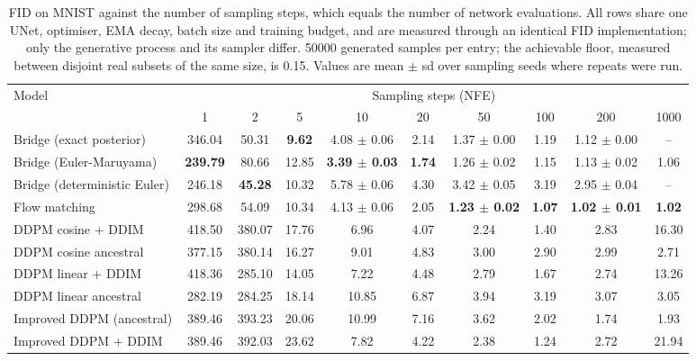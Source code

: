 \begin{table}[t]
\caption{FID on MNIST against the number of sampling steps, which equals the number of network evaluations. All rows share one UNet, optimiser, EMA decay, batch size and training budget, and are measured through an identical FID implementation; only the generative process and its sampler differ. 50000 generated samples per entry; the achievable floor, measured between disjoint real subsets of the same size, is 0.15. Values are mean $\pm$ sd over sampling seeds where repeats were run.}
\label{tab:fid-mnist}
\centering
\small
\begin{tabular}{lccccccccc}
\toprule
Model & \multicolumn{9}{c}{Sampling steps (NFE)} \\
\cmidrule(lr){2-10}
 & 1 & 2 & 5 & 10 & 20 & 50 & 100 & 200 & 1000 \\
\midrule
Bridge (exact posterior) & 346.04 & 50.31 & \textbf{9.62} & 4.08 $\pm$ 0.06 & 2.14 & 1.37 $\pm$ 0.00 & 1.19 & 1.12 $\pm$ 0.00 & -- \\
Bridge (Euler-Maruyama) & \textbf{239.79} & 80.66 & 12.85 & \textbf{3.39 $\pm$ 0.03} & \textbf{1.74} & 1.26 $\pm$ 0.02 & 1.15 & 1.13 $\pm$ 0.02 & 1.06 \\
Bridge (deterministic Euler) & 246.18 & \textbf{45.28} & 10.32 & 5.78 $\pm$ 0.06 & 4.30 & 3.42 $\pm$ 0.05 & 3.19 & 2.95 $\pm$ 0.04 & -- \\
Flow matching & 298.68 & 54.09 & 10.34 & 4.13 $\pm$ 0.06 & 2.05 & \textbf{1.23 $\pm$ 0.02} & \textbf{1.07} & \textbf{1.02 $\pm$ 0.01} & \textbf{1.02} \\
DDPM cosine + DDIM & 418.50 & 380.07 & 17.76 & 6.96 & 4.07 & 2.24 & 1.40 & 2.83 & 16.30 \\
DDPM cosine ancestral & 377.15 & 380.14 & 16.27 & 9.01 & 4.83 & 3.00 & 2.90 & 2.99 & 2.71 \\
DDPM linear + DDIM & 418.36 & 285.10 & 14.05 & 7.22 & 4.48 & 2.79 & 1.67 & 2.74 & 13.26 \\
DDPM linear ancestral & 282.19 & 284.25 & 18.14 & 10.85 & 6.87 & 3.94 & 3.19 & 3.07 & 3.05 \\
Improved DDPM (ancestral) & 389.46 & 393.23 & 20.06 & 10.99 & 7.16 & 3.62 & 2.02 & 1.74 & 1.93 \\
Improved DDPM + DDIM & 389.46 & 392.03 & 23.62 & 7.82 & 4.22 & 2.38 & 1.24 & 2.72 & 21.94 \\
\bottomrule
\end{tabular}
\end{table}

